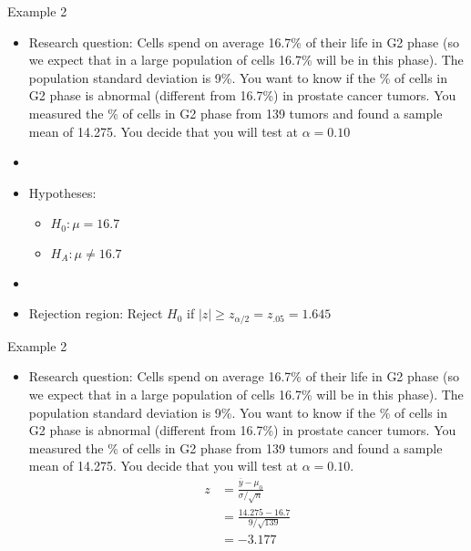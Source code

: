 \documentclass[xcolor=dvipsnames]{beamer}
\begin{document}
\begin{frame}{Example 2}
	\begin{itemize}
		\item Research question: Cells spend on average 16.7\% of their life in G2 phase (so we expect that in a large population of cells 16.7\% will be in this phase). The population standard deviation is 9\%. You want to know if the \% of cells in G2 phase is abnormal (different from 16.7\%) in prostate cancer tumors. You measured the \% of cells in G2 phase from 139 tumors and found a sample mean of 14.275. You decide that you will test at $\alpha = 0.10$  \pause
		\item[]
		\item Hypotheses:  \pause
		\begin{itemize}
			\item $H_0: \mu = 16.7$  \pause
			\item $H_A: \mu \neq 16.7$  \pause
		\end{itemize}
	\item[]
	\item Rejection region: Reject $H_0$ if $|z| \geq z_{\alpha / 2} = z_{.05} = 1.645$
	\end{itemize}
\end{frame}

\begin{frame}{Example 2}
	\begin{itemize}
		\item Research question: Cells spend on average 16.7\% of their life in G2 phase (so we expect that in a large population of cells 16.7\% will be in this phase). The population standard deviation is 9\%. You want to know if the \% of cells in G2 phase is abnormal (different from 16.7\%) in prostate cancer tumors. You measured the \% of cells in G2 phase from 139 tumors and found a sample mean of 14.275. You decide that you will test at $\alpha = 0.10$.
		\begin{align*}
			z &= \frac{\bar{y} - \mu_0}{\sigma / \sqrt{n}} \\
			&= \frac{14.275 - 16.7}{9 / \sqrt{139}} \\
			&= -3.177
		\end{align*}
	\end{itemize}
\end{frame}
\end{document}
